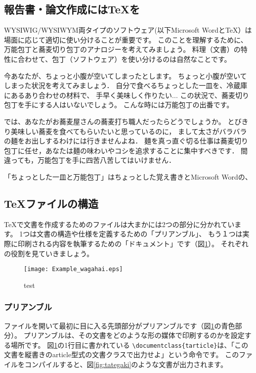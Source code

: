\documentclass[TeXworkshop]{subfiles}
\begin{document}
\subsection{報告書・論文作成には\TeX を}
WYSIWIG/WYSIWYM両タイプのソフトウェア(以下Microsoft Wordと\TeX）は場面に応じて適切に使い分けることが重要です。
このことを理解するために、万能包丁と蕎麦切り包丁のアナロジーを考えてみましょう。
料理（文書）の特性に合わせて、包丁（ソフトウェア）を使い分けるのは自然なことです。

今あなたが、ちょっと小腹が空いてしまったとします。
ちょっと小腹が空いてしまった状況を考えてみましょう．
自分で食べるちょっとした一皿を、冷蔵庫にあるあり合わせの材料で、
手早く美味しく作りたい...
この状況で、蕎麦切り包丁を手にする人はいないでしょう。
こんな時には万能包丁の出番です。

では、あなたがお蕎麦屋さんの蕎麦打ち職人だったらどうでしょうか。
とびきり美味しい蕎麦を食べてもらいたいと思っているのに，
まして太さがバラバラの麺をお出しするわけには行きませんよね．
麺を真っ直ぐ切る仕事は蕎麦切り包丁に任せ，あなたは麺の味わいやコシを追求することに集中すべきです．
間違っても，万能包丁を手に四苦八苦してはいけません．

「ちょっとした一皿と万能包丁」はちょっとした覚え書きとMicrosoft Wordの、

\subsection{\TeX ファイルの構造}
\TeX で文書を作成するためのファイルは大まかには2つの部分に分かれています。
1つは文書の構造や仕様を定義するための「プリアンブル」、
もう１つは実際に印刷される内容を執筆するための「ドキュメント」です（図\ref{fig:example_wagahai}）。
それぞれの役割を見ていきましょう。

\begin{figure}[H]
\begin{center}
\texttt{[image: Example\_wagahai.eps]}
\caption{test}\label{fig:example_wagahai}
\end{center}
\end{figure}

\subsubsection{プリアンブル}
ファイルを開いて最初に目に入る先頭部分がプリアンブルです（図\ref{fig:example_wagahai}の青色部分）。
プリアンブルは、その文書をどのような形の媒体で印刷するのかを設定する場所です。
図\ref{fig:example_wagahai}の1行目に書かれている
\verb|\documentclass{tarticle}|は、「この文書を縦書きのarticle型式の文書クラスで出力せよ」という命令です。
このファイルをコンパイルすると、図\ref{fig:tategaki}のような文書が出力されます。
\end{document}
